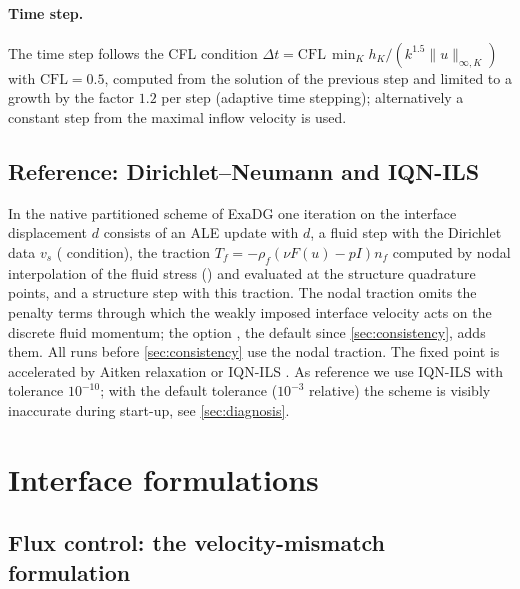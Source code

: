 \documentclass[11pt,a4paper]{article}
\theoremstyle{definition}
\theoremstyle{remark}
\begin{document}
\paragraph{Time step.} The time step follows the CFL condition
$\Delta t=\mathrm{CFL}\,\min_K h_K/(k^{1.5}\|u\|_{\infty,K})$ with $\mathrm{CFL}=0.5$, computed
from the solution of the previous step and limited to a growth by the factor $1.2$ per step
(adaptive time stepping); alternatively a constant step from the maximal inflow velocity is used.

\subsection{Reference: Dirichlet--Neumann and IQN-ILS}

In the native partitioned scheme of ExaDG one iteration on the interface displacement $d$ consists
of an ALE update with $d$, a fluid step with the Dirichlet data $v_s$ (
condition), the traction $T_f = -\rho_f(\nu F(u)-pI)n_f$ computed by nodal interpolation of the
fluid stress () and evaluated at the structure quadrature points, and
a structure step with this traction. The nodal traction omits the penalty terms through which the
weakly imposed interface velocity acts on the discrete fluid momentum; the option
, the default since \cref{sec:consistency}, adds them. All
runs before \cref{sec:consistency} use the nodal traction. The fixed point is accelerated by Aitken relaxation or IQN-ILS
\cite{Degroote2009}. As reference we use IQN-ILS with tolerance $10^{-10}$; with the default
tolerance ($10^{-3}$ relative) the scheme is visibly inaccurate during start-up, see
\cref{sec:diagnosis}.

\section{Interface formulations}\label{sec:formulations}

\subsection{Flux control: the velocity-mismatch formulation}\label{sec:oc}
\end{document}

